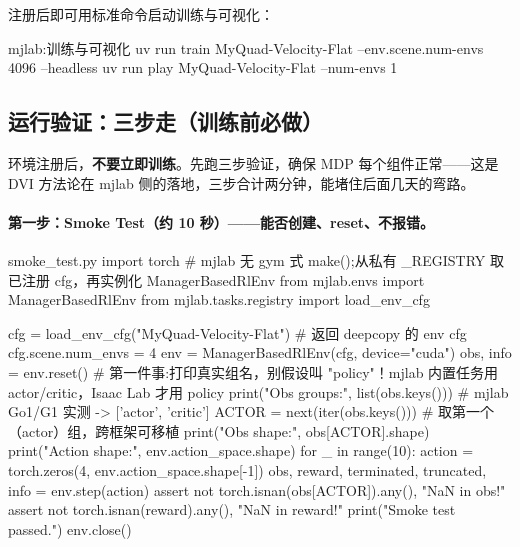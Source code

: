 注册后即可用标准命令启动训练与可视化：

\begin{codebox}[bash]{mjlab:训练与可视化}
uv run train MyQuad-Velocity-Flat --env.scene.num-envs 4096 --headless
uv run play  MyQuad-Velocity-Flat --num-envs 1
\end{codebox}


\subsection{运行验证：三步走（训练前必做）}
\label{sec:rlmc-diy-threestep}

环境注册后，\textbf{不要立即训练}。先跑三步验证，确保 MDP 每个组件正常——这是 DVI 方法论在 mjlab 侧的落地，三步合计两分钟，能堵住后面几天的弯路。

\paragraph{第一步：Smoke Test（约 10 秒）——能否创建、reset、不报错。}

\begin{codebox}[Python]{smoke\_test.py}
import torch
# mjlab 无 gym 式 make();从私有 _REGISTRY 取已注册 cfg，再实例化 ManagerBasedRlEnv
from mjlab.envs import ManagerBasedRlEnv
from mjlab.tasks.registry import load_env_cfg

cfg = load_env_cfg("MyQuad-Velocity-Flat")        # 返回 deepcopy 的 env cfg
cfg.scene.num_envs = 4
env = ManagerBasedRlEnv(cfg, device="cuda")
obs, info = env.reset()
# 第一件事:打印真实组名，别假设叫 "policy"！mjlab 内置任务用 actor/critic，Isaac Lab 才用 policy
print("Obs groups:", list(obs.keys()))            # mjlab Go1/G1 实测 -> ['actor', 'critic']
ACTOR = next(iter(obs.keys()))                    # 取第一个（actor）组，跨框架可移植
print("Obs  shape:", obs[ACTOR].shape)
print("Action shape:", env.action_space.shape)
for _ in range(10):
    action = torch.zeros(4, env.action_space.shape[-1])
    obs, reward, terminated, truncated, info = env.step(action)
    assert not torch.isnan(obs[ACTOR]).any(), "NaN in obs!"
    assert not torch.isnan(reward).any(),     "NaN in reward!"
print("Smoke test passed.")
env.close()
\end{codebox}

